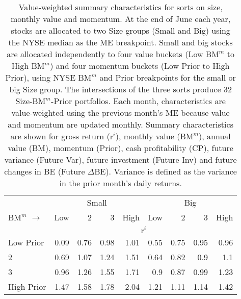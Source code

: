 
\begin{table}[!ht]
\scriptsize
\centering
\caption{
\scriptsize{
Value-weighted summary characteristics for sorts on size, monthly value and
momentum.
At the end of June each year, stocks are allocated to two Size groups
(Small and Big) using the NYSE median as the ME breakpoint.
Small and big stocks are allocated independently to four value buckets (Low
$\text{BM}^m$ to High $\text{BM}^m$) and four momentum buckets
(Low Prior to High Prior), using NYSE $\text{BM}^m$ and Prior breakpoints for
the small or big Size group.
The intersections of the three sorts produce 32 Size-$\text{BM}^m$-Prior
portfolios.
Each month, characteristics are value-weighted using the previous month's ME
because value and momentum are updated monthly.
Summary characteristics are shown for
gross return ($\text{r}^i$),
monthly value ($\text{BM}^m$),
annual value (BM),
momentum (Prior),
cash profitability (CP),
future variance (Future Var),
future investment (Future Inv) and
future changes in BE (Future $\Delta$BE).
Variance is defined as the variance in the prior month's daily returns.
}
}
\begin{tabular}{lrrrrrrrr}
  \toprule
     & \multicolumn{4}{c}{Small} & \multicolumn{4}{c}{Big}  \\
     \cmidrule(r){2-5} \cmidrule(r){6-9}
    $\text{BM}^m$ $\rightarrow$ & Low & 2 & 3 & High & Low & 2 & 3 & High  \\ 
  \midrule
  
  
    & \multicolumn{8}{c}{$\text{r}^i$}  \\
     \cmidrule(r){2-5} \cmidrule(r){6-9}
    Low Prior  & 0.09  & 0.76  & 0.98  & 1.01  & 0.55  & 0.75  & 0.95  & 0.96   \\
    2  & 0.69  & 1.07  & 1.24  & 1.51  & 0.64  & 0.82  & 0.9  & 1.1   \\
    3  & 0.96  & 1.26  & 1.55  & 1.71  & 0.9  & 0.87  & 0.99  & 1.23   \\
    High Prior  & 1.47  & 1.58  & 1.78  & 2.04  & 1.21  & 1.11  & 1.14  & 1.42   \\
    
  
    

\end{tabular}
\end{table}
